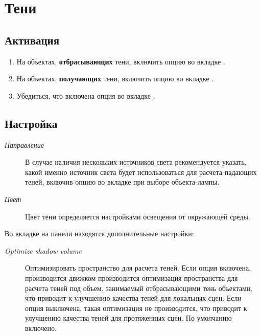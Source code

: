 \documentclass[a4paper,12pt,oneside]{sphinxmanual}
\begin{document}
\section{Тени}
\label{lighting:id8}

\subsection{Активация}
\label{lighting:id9}\begin{enumerate}
\item {} 
На объектах, \textbf{отбрасывающих} тени, включить опцию  во вкладке .

\item {} 
На объектах, \textbf{получающих} тени, включить опцию  во вкладке .

\item {} 
Убедиться, что включена опция  во вкладке .

\end{enumerate}


\subsection{Настройка}
\label{lighting:id10}\begin{description}
\item[{\emph{Направление}}] \leavevmode
В случае наличия нескольких источников света рекомендуется указать, какой именно источник света будет использоваться для расчета падающих теней, включив опцию  во вкладке  при выборе объекта-лампы.

\item[{\emph{Цвет}}] \leavevmode
Цвет тени определяется настройками освещения от окружающей среды.

\end{description}

Во вкладке  на панели  находятся дополнительные настройки:
\begin{description}
\item[{\emph{Optimize shadow volume}}] \leavevmode
Оптимизировать пространство для расчета теней. Если опция включена, производится движком производится оптимизация пространства для расчета теней под объем, занимаемый отбрасывающими тень объектами, что приводит к улучшению качества теней для локальных сцен. Если опция выключена, такая оптимизация не производится, что приводит к улучшению качества теней для протяженных сцен. По умолчанию включено.

\end{description}
\end{document}
